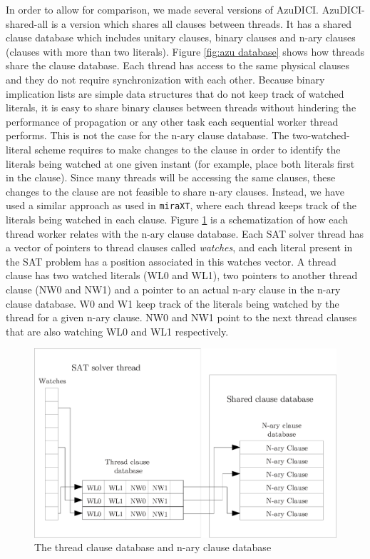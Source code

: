 In order to allow for comparison, we made several versions of AzuDICI.
AzuDICI-shared-all is a version which shares all clauses between
threads. It has a shared clause database which includes unitary
clauses, binary clauses and n-ary clauses (clauses with more than
two literals). Figure \ref{fig:azu database}
shows how threads share the clause database. Each thread has access
to the same physical clauses and they do not require synchronization
with each other.
Because binary implication lists are simple data structures that do
not keep track of watched literals, it is easy to share binary clauses
between threads without hindering the performance of propagation
or any other task each sequential worker thread performs. This is not
the case for the n-ary clause database. The two-watched-literal
scheme requires to make changes to the clause in order to identify
the literals being watched at one given instant (for example, place
both literals first in the clause). Since many threads will be
accessing the same clauses, these changes to the clause are not
feasible to share n-ary clauses. Instead, we have used a similar 
approach as used in
{\tt miraXT}, where each thread keeps track of the literals being
watched in each clause. Figure \ref{fig:azu design} is a
schematization of how each thread worker relates with the n-ary
clause database. Each SAT solver thread has a vector of pointers
to thread clauses called \textit{watches}, and each literal present
in the SAT problem has a position associated in this watches vector.
A thread clause has two watched literals (WL0 and WL1), two
pointers to another thread clause (NW0 and NW1) and a pointer to
an actual n-ary clause in the n-ary clause database. W0 and W1 keep
track of the literals being watched by the thread for a given n-ary
clause. NW0 and NW1 point to the next thread clauses that are also 
watching WL0 and WL1 respectively.

\begin{figure}[tp]
  \centering
  \includegraphics[scale=0.6]{AzuDICI_design}
  \caption{The thread clause database and n-ary clause database}
  \label{fig:azu design}
\end{figure}

